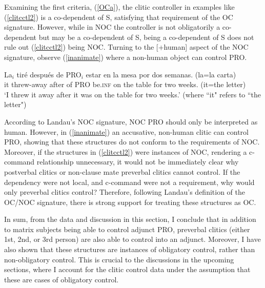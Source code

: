 \documentclass[output=paper,colorlinks,citecolor=brown]{langscibook}
\begin{document}
Examining the first criteria, (\ref{OCa}), the clitic controller in examples like (\ref{clitcctl2}) is a co-dependent of S, satisfying that requirement of the OC signature. However, while in NOC the controller is not obligatorily a co-dependent but may be a co-dependent of S, being a co-dependent of S does not rule out (\ref{clitcctl2}) being NOC. Turning to the [+human] aspect of the NOC signature, observe (\ref{inanimate}) where a non-human object can control PRO.


\ea \label{inanimate}
\ea
{
\gll La$_i$ tiré después de PRO$_i$ estar en la mesa por dos semanas. (la=la carta) \\
it threw-away after of PRO be.\textsc{inf} on the table for two weeks. (it=the letter) \\
\glt ‘I threw it away after it was on the table for two weeks.’ (where ``it" refers to ``the letter")}
\z
\z

\largerpage[-1]
According to Landau’s NOC signature, NOC PRO should only be interpreted as human. However, in (\ref{inanimate}) an accusative, non-human clitic can control PRO, showing that these structures do not conform to the requirements of NOC. Moreover, if the structures in (\ref{clitcctl2}) were instances of NOC, rendering a c-command relationship unnecessary, it would not be immediately clear why postverbal clitics or non-clause mate preverbal clitics cannot control. If the dependency were not local, and c-command were not a requirement, why would only preverbal clitics control? Therefore, following Landau’s definition of the OC/NOC signature, there is strong support for treating these structures as OC.


In sum, from the data and discussion in this section, I conclude that in addition to matrix subjects being able to control adjunct PRO, preverbal clitics (either 1st, 2nd, or 3rd person) are also able to control into an adjunct. Moreover, I have also shown that these structures are instances of obligatory control, rather than non-obligatory control. This is crucial to the discussions in the upcoming sections, where I account for the clitic control data under the assumption that these are cases of obligatory control.
\end{document}

